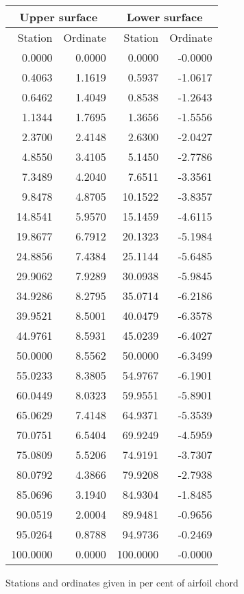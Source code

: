 \documentclass[11pt]{book}
\begin{document}
 \hspace{4mm}
 \begin{tabular}{|r|r|r|r|} \hline 
 \multicolumn{2}{|c|}{Upper surface} & \multicolumn{2}{|c|}{Lower surface} \\
 \hline
 Station & Ordinate & Station & Ordinate \\
 \hline
0.0000 & 0.0000 & 0.0000 & -0.0000 \\
0.4063 & 1.1619 & 0.5937 & -1.0617 \\
0.6462 & 1.4049 & 0.8538 & -1.2643 \\
1.1344 & 1.7695 & 1.3656 & -1.5556 \\
2.3700 & 2.4148 & 2.6300 & -2.0427 \\
4.8550 & 3.4105 & 5.1450 & -2.7786 \\
7.3489 & 4.2040 & 7.6511 & -3.3561 \\
9.8478 & 4.8705 & 10.1522 & -3.8357 \\
14.8541 & 5.9570 & 15.1459 & -4.6115 \\
19.8677 & 6.7912 & 20.1323 & -5.1984 \\
24.8856 & 7.4384 & 25.1144 & -5.6485 \\
29.9062 & 7.9289 & 30.0938 & -5.9845 \\
34.9286 & 8.2795 & 35.0714 & -6.2186 \\
39.9521 & 8.5001 & 40.0479 & -6.3578 \\
44.9761 & 8.5931 & 45.0239 & -6.4027 \\
50.0000 & 8.5562 & 50.0000 & -6.3499 \\
55.0233 & 8.3805 & 54.9767 & -6.1901 \\
60.0449 & 8.0323 & 59.9551 & -5.8901 \\
65.0629 & 7.4148 & 64.9371 & -5.3539 \\
70.0751 & 6.5404 & 69.9249 & -4.5959 \\
75.0809 & 5.5206 & 74.9191 & -3.7307 \\
80.0792 & 4.3866 & 79.9208 & -2.7938 \\
85.0696 & 3.1940 & 84.9304 & -1.8485 \\
90.0519 & 2.0004 & 89.9481 & -0.9656 \\
95.0264 & 0.8788 & 94.9736 & -0.2469 \\
100.0000 & 0.0000 & 100.0000 & -0.0000 \\
 \hline 
 \end{tabular}
 \vspace{8mm}

Stations and ordinates given in per cent of airfoil chord
\end{document}
